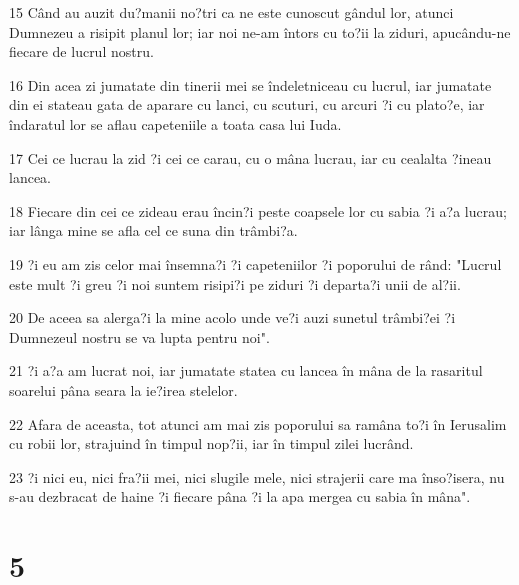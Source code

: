 \par 15 Când au auzit du?manii no?tri ca ne este cunoscut gândul lor, atunci Dumnezeu a risipit planul lor; iar noi ne-am întors cu to?ii la ziduri, apucându-ne fiecare de lucrul nostru.
\par 16 Din acea zi jumatate din tinerii mei se îndeletniceau cu lucrul, iar jumatate din ei stateau gata de aparare cu lanci, cu scuturi, cu arcuri ?i cu plato?e, iar îndaratul lor se aflau capeteniile a toata casa lui Iuda.
\par 17 Cei ce lucrau la zid ?i cei ce carau, cu o mâna lucrau, iar cu cealalta ?ineau lancea.
\par 18 Fiecare din cei ce zideau erau încin?i peste coapsele lor cu sabia ?i a?a lucrau; iar lânga mine se afla cel ce suna din trâmbi?a.
\par 19 ?i eu am zis celor mai însemna?i ?i capeteniilor ?i poporului de rând: "Lucrul este mult ?i greu ?i noi suntem risipi?i pe ziduri ?i departa?i unii de al?ii.
\par 20 De aceea sa alerga?i la mine acolo unde ve?i auzi sunetul trâmbi?ei ?i Dumnezeul nostru se va lupta pentru noi".
\par 21 ?i a?a am lucrat noi, iar jumatate statea cu lancea în mâna de la rasaritul soarelui pâna seara la ie?irea stelelor.
\par 22 Afara de aceasta, tot atunci am mai zis poporului sa ramâna to?i în Ierusalim cu robii lor, strajuind în timpul nop?ii, iar în timpul zilei lucrând.
\par 23 ?i nici eu, nici fra?ii mei, nici slugile mele, nici strajerii care ma înso?isera, nu s-au dezbracat de haine ?i fiecare pâna ?i la apa mergea cu sabia în mâna".

\chapter{5}

